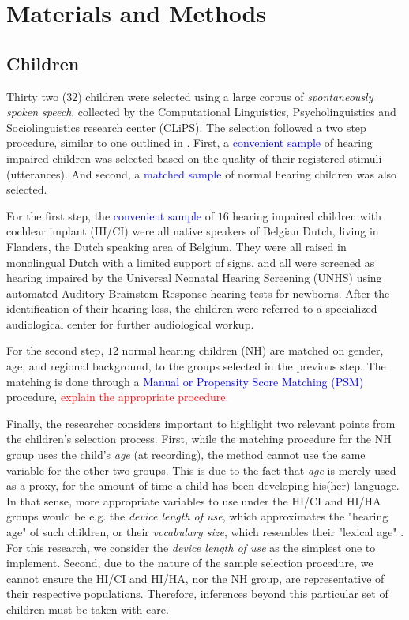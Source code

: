 \section{Materials and Methods}
%
\subsection{Children}
%
Thirty two ($32$) children were selected using a large corpus of \textit{spontaneously spoken speech}, collected by the Computational Linguistics, Psycholinguistics and Sociolinguistics research center (CLiPS). The selection followed a two step procedure, similar to one outlined in \citet{Faes_et_al_2021}. First, a \textcolor{blue}{convenient sample} of hearing impaired children was selected based on the quality of their registered stimuli (utterances). And second, a \textcolor{blue}{matched sample} of normal hearing children was also selected.

For the first step, the \textcolor{blue}{convenient sample} of $16$ hearing impaired children with cochlear implant (HI/CI) were all native speakers of Belgian Dutch, living in Flanders, the Dutch speaking area of Belgium. They were all raised in monolingual Dutch with a limited support of signs, and all were screened as hearing impaired by the Universal Neonatal Hearing Screening (UNHS) using automated Auditory Brainstem Response hearing tests for newborns. After the identification of their hearing loss, the children were referred to a specialized audiological center for further audiological workup.

For the second step, $12$ normal hearing children (NH) are matched on gender, age, and regional background, to the groups selected in the previous step. The matching is done through a \textcolor{blue}{Manual or Propensity Score Matching (PSM)} procedure, \textcolor{red}{explain the appropriate procedure}.

Finally, the researcher considers important to highlight two relevant points from the children's selection process. First, while the matching procedure for the NH group uses the child's \textit{age} (at recording), the method cannot use the same variable for the other two groups. This is due to the fact that \textit{age} is merely used as a proxy, for the amount of time a child has been developing his(her) language. In that sense, more appropriate variables to use under the HI/CI and HI/HA groups would be e.g. the \textit{device length of use}, which approximates the "hearing age" of such children, or their \textit{vocabulary size}, which resembles their "lexical age" \citep{Faes_et_al_2021}. For this research, we consider the \textit{device length of use} as the simplest one to implement. Second, due to the nature of the sample selection procedure, we cannot ensure the HI/CI and HI/HA, nor the NH group, are representative of their respective populations. Therefore, inferences beyond this particular set of children must be taken with care.

